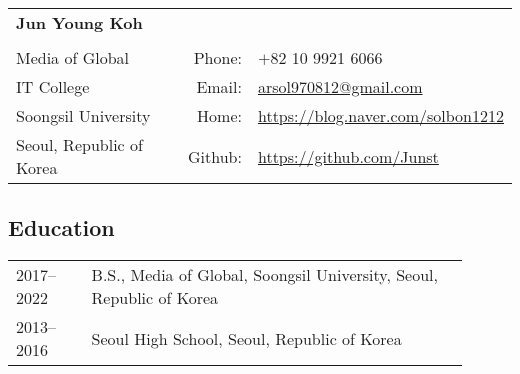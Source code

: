 \documentclass[12pt,]{scrartcl}
\date{}
\begin{document}
\begin{table}[h]
{\def\arraystretch{1.2}\tabcolsep=0pt
\begin{tabular}{p{0.60\linewidth}p{0.05\linewidth}p{0.35\linewidth}}

  \multirow{1}{*}{\LARGE \textbf{Jun Young Koh}} &  &  \\
  
  & & \\
  
  Media of Global & \multicolumn{1}{r}{Phone:\;\;} & \multicolumn{1}{l}{$+$82 10 9921 6066} \\
  
  IT College& \multicolumn{1}{r}{Email:\;\;} &\multicolumn{1}{l}{\href{lphiri@cs.uct.ac.za}{arsol970812@gmail.com}} \\
  
  Soongsil University& \multicolumn{1}{r}{Home:\;\;} & \multicolumn{1}{l}{\url{https://blog.naver.com/solbon1212}} \\
  
  Seoul, Republic of Korea & \multicolumn{1}{r}{Github:\;\;} & \multicolumn{1}{l}{\url{https://github.com/Junst}} \\

\end{tabular}%
}
\end{table}

\subsection{Education}\label{education}

\begin{table}[h]
{\def\arraystretch{1.5}\tabcolsep=0pt
\begin{tabular}{p{0.15\linewidth}p{0.75\linewidth}}

  
  

  2017--2022 & B.S., Media of Global, Soongsil University, Seoul, Republic of Korea \\
  
  2013--2016 & Seoul High School, Seoul, Republic of Korea \\

\end{tabular}%
}
\end{table}
\end{document}
